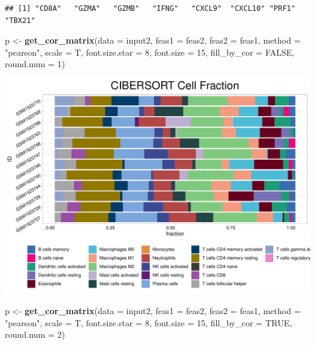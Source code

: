 \documentclass[
  12pt,
]{book}
\newenvironment{Shaded}{\begin{snugshade}}{\end{snugshade}}
\newcommand{\AttributeTok}[1]{\textcolor[rgb]{0.13,0.29,0.53}{#1}}
\newcommand{\ConstantTok}[1]{\textcolor[rgb]{0.56,0.35,0.01}{#1}}
\newcommand{\DecValTok}[1]{\textcolor[rgb]{0.00,0.00,0.81}{#1}}
\newcommand{\FunctionTok}[1]{\textcolor[rgb]{0.13,0.29,0.53}{\textbf{#1}}}
\newcommand{\NormalTok}[1]{#1}
\newcommand{\OtherTok}[1]{\textcolor[rgb]{0.56,0.35,0.01}{#1}}
\newcommand{\StringTok}[1]{\textcolor[rgb]{0.31,0.60,0.02}{#1}}
\theoremstyle{definition}
\theoremstyle{definition}
\theoremstyle{definition}
\theoremstyle{definition}
\theoremstyle{remark}
\begin{document}
\begin{verbatim}
## [1] "CD8A"   "GZMA"   "GZMB"   "IFNG"   "CXCL9"  "CXCL10" "PRF1"   "TBX21"
\end{verbatim}

\begin{Shaded}
\begin{Highlighting}[]
\NormalTok{p }\OtherTok{\textless{}{-}} \FunctionTok{get\_cor\_matrix}\NormalTok{(}\AttributeTok{data           =}\NormalTok{ input2, }
                    \AttributeTok{feas1          =}\NormalTok{ feas2, }
                    \AttributeTok{feas2          =}\NormalTok{ feas1,}
                    \AttributeTok{method         =} \StringTok{"pearson"}\NormalTok{,}
                    \AttributeTok{scale          =}\NormalTok{ T, }
                    \AttributeTok{font.size.star =} \DecValTok{8}\NormalTok{, }
                    \AttributeTok{font.size      =} \DecValTok{15}\NormalTok{, }
                    \AttributeTok{fill\_by\_cor    =} \ConstantTok{FALSE}\NormalTok{, }
                    \AttributeTok{round.num      =} \DecValTok{1}\NormalTok{)}
\end{Highlighting}
\end{Shaded}

\includegraphics{_main_files/figure-latex/unnamed-chunk-55-1.pdf}

\begin{Shaded}
\begin{Highlighting}[]
\NormalTok{p }\OtherTok{\textless{}{-}} \FunctionTok{get\_cor\_matrix}\NormalTok{(}\AttributeTok{data           =}\NormalTok{ input2, }
                    \AttributeTok{feas1          =}\NormalTok{ feas2, }
                    \AttributeTok{feas2          =}\NormalTok{ feas1,}
                    \AttributeTok{method         =} \StringTok{"pearson"}\NormalTok{,}
                    \AttributeTok{scale          =}\NormalTok{ T, }
                    \AttributeTok{font.size.star =} \DecValTok{8}\NormalTok{, }
                    \AttributeTok{font.size      =} \DecValTok{15}\NormalTok{, }
                    \AttributeTok{fill\_by\_cor    =} \ConstantTok{TRUE}\NormalTok{, }
                    \AttributeTok{round.num      =} \DecValTok{2}\NormalTok{)}
\end{Highlighting}
\end{Shaded}
\end{document}
